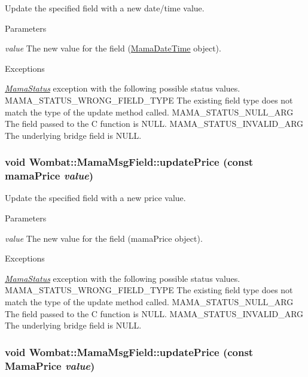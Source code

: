 Update the specified field with a new date/time value. 
\begin{DoxyParams}{Parameters}
\item[{\em value}]The new value for the field (\hyperlink{classWombat_1_1MamaDateTime}{MamaDateTime} object).\end{DoxyParams}

\begin{DoxyExceptions}{Exceptions}
\item[{\em \hyperlink{classWombat_1_1MamaStatus}{MamaStatus}}]exception with the following possible status values. MAMA\_\-STATUS\_\-WRONG\_\-FIELD\_\-TYPE The existing field type does not match the type of the update method called. MAMA\_\-STATUS\_\-NULL\_\-ARG The field passed to the C function is NULL. MAMA\_\-STATUS\_\-INVALID\_\-ARG The underlying bridge field is NULL. \end{DoxyExceptions}
\hypertarget{classWombat_1_1MamaMsgField_a25858892b10ed3f724a335bbd5b723de}{
\subsubsection[{updatePrice}]{\setlength{\rightskip}{0pt plus 5cm}void Wombat::MamaMsgField::updatePrice (const mamaPrice {\em value})}}
\label{classWombat_1_1MamaMsgField_a25858892b10ed3f724a335bbd5b723de}


Update the specified field with a new price value. 
\begin{DoxyParams}{Parameters}
\item[{\em value}]The new value for the field (mamaPrice object).\end{DoxyParams}

\begin{DoxyExceptions}{Exceptions}
\item[{\em \hyperlink{classWombat_1_1MamaStatus}{MamaStatus}}]exception with the following possible status values. MAMA\_\-STATUS\_\-WRONG\_\-FIELD\_\-TYPE The existing field type does not match the type of the update method called. MAMA\_\-STATUS\_\-NULL\_\-ARG The field passed to the C function is NULL. MAMA\_\-STATUS\_\-INVALID\_\-ARG The underlying bridge field is NULL. \end{DoxyExceptions}
\hypertarget{classWombat_1_1MamaMsgField_a1d8b0daa41c6ce10124701cd84fac3f6}{
\subsubsection[{updatePrice}]{\setlength{\rightskip}{0pt plus 5cm}void Wombat::MamaMsgField::updatePrice (const {\bf MamaPrice} {\em value})}}
\label{classWombat_1_1MamaMsgField_a1d8b0daa41c6ce10124701cd84fac3f6}


